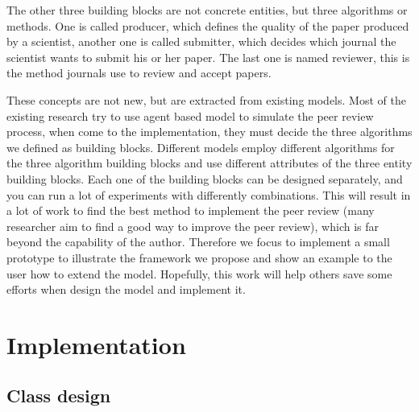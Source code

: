 \documentclass[11pt]{article}
\begin{document}
The other three building blocks are not concrete entities, but three algorithms or methods. One is called producer, which defines the quality of the paper produced by a scientist, another one is called submitter, which decides which journal the scientist wants to submit his or her paper. The last one is named reviewer, this is the method journals use to review and accept papers.

These concepts are not new, but are extracted from existing models. Most of the existing research try to use agent based model to simulate the peer review process, when come to the implementation, they must decide the three algorithms we defined as building blocks. Different models employ different algorithms for the three algorithm building blocks and use different attributes of the three entity building blocks. Each one of the building blocks can be designed separately, and you can run a lot of experiments with differently combinations. This will result in a lot of work to find the best method to implement the peer review (many researcher aim to find a good way to improve the peer review), which is far beyond the capability of the author. Therefore we focus to implement a small prototype to illustrate the framework we propose and show an example to the user how to extend the model. Hopefully, this work will help others save some efforts when design the model and implement it.

\newpage

\section{Implementation}

\subsection{Class design}
\end{document}
